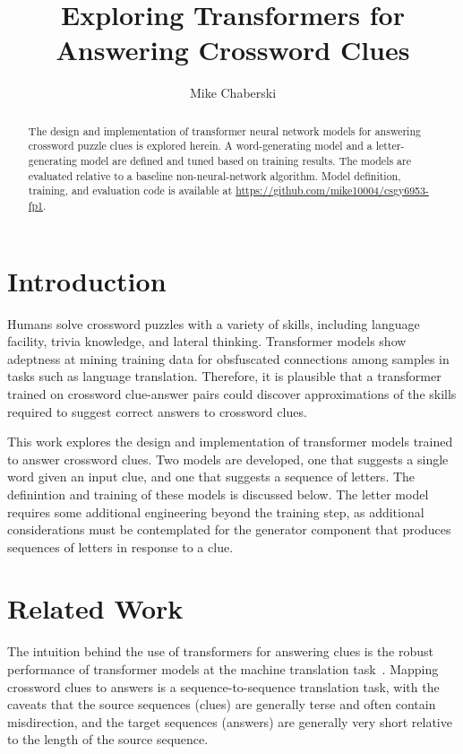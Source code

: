 \documentclass[letterpaper]{article} %
\title{Exploring Transformers for Answering Crossword Clues}
\author {
    Mike Chaberski
}
\begin{document}
\maketitle

\begin{abstract}
    The design and implementation of transformer neural network models for answering crossword puzzle clues is explored herein.
    A word-generating model and a letter-generating model are defined and tuned based on training results.
    The models are evaluated relative to a baseline non-neural-network algorithm.
    Model definition, training, and evaluation code is available at \url{https://github.com/mike10004/csgy6953-fp1}.
\end{abstract}

\begin{NoHyper}

\section{Introduction}
\label{sec:intro}

Humans solve crossword puzzles with a variety of skills, including language facility, trivia knowledge, and lateral thinking.
Transformer models show adeptness at mining training data for obsfuscated connections among samples in tasks such as language translation.
Therefore, it is plausible that a transformer trained on crossword clue-answer pairs could discover approximations of the
skills required to suggest correct answers to crossword clues.

This work explores the design and implementation of transformer models trained to answer crossword clues.
Two models are developed, one that suggests a single word given an input clue, and one that suggests a
sequence of letters.
The definintion and training of these models is discussed below.
The letter model requires some additional engineering beyond the training step, as
additional considerations must be contemplated for the generator component that produces
sequences of letters in response to a clue.

\section{Related Work}
\label{sec:related}

The intuition behind the use of transformers for answering clues is the robust performance of transformer models at
the machine translation task~\cite{vaswani2017}.
Mapping crossword clues to answers is a sequence-to-sequence translation task, with the caveats that the source
sequences (clues) are generally terse and often contain misdirection, and the target sequences (answers) are
generally very short relative to the length of the source sequence.


\end{NoHyper}
\end{document}
